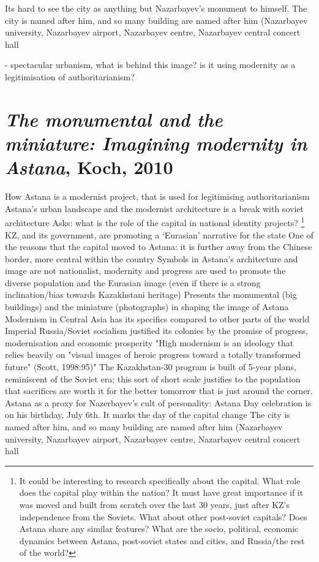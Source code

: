 \documentclass[11pt]{article}
\begin{document}
Its hard to see the city as anything but Nazarbayev's monument to himself. The city is named after him, and so many building are named after him (Nazarbayev university, Nazarbayev airport, Nazarbayev centre, Nazarbayev central concert hall


- spectacular urbanism, what is behind this image? is it using modernity as a legitimisation of authoritarianism?


\section{\textit{The monumental and the miniature: Imagining modernity in Astana}, Koch, 2010}

\begin{outline}
	\1 How Astana is a modernist project, that is used for legitimising authoritarianism
	\1 Astana's urban landscape and the modernist architecture is a break with soviet architecture
	\1 Asks: what is the role of the capital in national identity projects? \footnote{It could be interesting to research specifically about the capital. What role does the capital play within the nation? It must have great importance if it was moved and built from scratch over the last 30 years, just after KZ's independence from the Soviets. What about other post-soviet capitals? Does Astana share any similar features? What are the socio, political, economic dynamics between Astana, post-soviet states and cities, and Russia/the rest of the world?}
	\1 KZ, and its government, are promoting a `Eurasian' narrative for the state
		\2 One of the reasons that the capital moved to Astana: it is further away from the Chinese border, more central within the country
		\2 Symbols in Astana's architecture and image are not nationalist, modernity and progress are used to promote the diverse population and the Eurasian image (even if there is a strong inclination/bias towards Kazakhstani heritage)
	\1 Presents the monumental (big buildings) and the miniature (photographs) in shaping the image of Astana
	\1 Modernism in Central Asia has its specifics compared to other parts of the world
		\2 Imperial Russia/Soviet socialism justified its colonies by the promise of progress, modernisation and economic prosperity
	\1 "High modernism is an ideology that relies heavily on "visual images of heroic progress toward a totally transformed future" (Scott, 1998:95)"
	\1 The Kazakhstan-30 program is built of 5-year plans, reminiscent of the Soviet era; this sort of short scale justifies to the population that sacrifices are worth it for the better tomorrow that is just around the corner.
	\1 Astana as a proxy for Nazerbayev's cult of personality:
		\2 Astana Day celebration is on his birthday, July 6th. It marks the day of the capital change
		\2 The city is named after him, and so many building are named after him (Nazarbayev university, Nazarbayev airport, Nazarbayev centre, Nazarbayev central concert hall
\end{outline}
\end{document}
